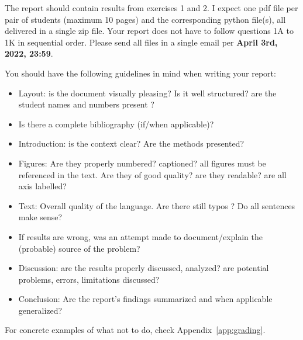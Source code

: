 The report should contain results from exercises 1 and 2. I expect one pdf file per pair of students
(maximum 10 pages) and the corresponding python file(s), all delivered in a single zip file.
Your report does not have to follow questions 1A to 1K in sequential order. 
Please send all files in a single email per {\bf April 3rd, 2022, 23:59}. 

You should have the following guidelines in mind when writing your report:
\begin{itemize}
\item Layout: is the document visually pleasing? Is it well structured? are the student names 
and numbers present ?
\item Is there a complete bibliography (if/when applicable)?
\item Introduction: is the context clear? Are the methods presented?
\item Figures: Are they properly numbered? captioned? all figures must be referenced in the text. 
Are they of good quality? are they readable? are all axis labelled?
\item Text: Overall quality of the language. Are there still typos ? Do all sentences make sense?
\item If results are wrong, was an attempt made to document/explain the (probable) source
of the problem?
\item Discussion: are the results properly discussed, analyzed? are potential problems, 
errors, limitations discussed?
\item Conclusion: Are the report's findings summarized and when applicable generalized?
\end{itemize}
For concrete examples of what not to do, check Appendix~\ref{app:grading}.



